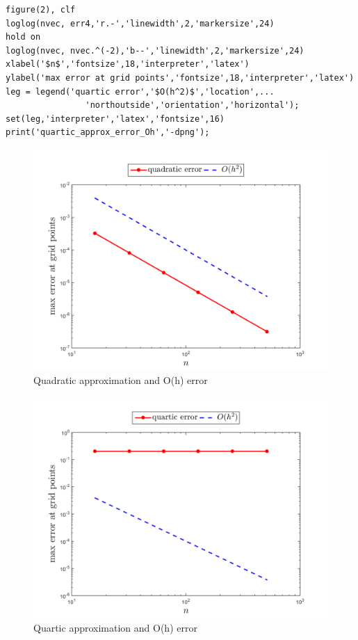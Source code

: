 \documentclass[14pt,a4paper]{article}
\begin{document}
\begin{enumerate}
\begin{lstlisting}
figure(2), clf
loglog(nvec, err4,'r.-','linewidth',2,'markersize',24)
hold on
loglog(nvec, nvec.^(-2),'b--','linewidth',2,'markersize',24)
xlabel('$n$','fontsize',18,'interpreter','latex')
ylabel('max error at grid points','fontsize',18,'interpreter','latex')
leg = legend('quartic error','$O(h^2)$','location',...
				'northoutside','orientation','horizontal');
set(leg,'interpreter','latex','fontsize',16)
print('quartic_approx_error_Oh','-dpng');
	\end{lstlisting}
	\begin{figure}[htp]
		\begin{center}
			\includegraphics[scale=0.65]{quadratic_approx_error_Oh.png}
			\caption{Quadratic approximation and O(h) error}
		\end{center}
	\end{figure}
	\begin{figure}[htp]
		\begin{center}
			\includegraphics[scale=0.65]{quartic_approx_error_Oh.png}
			\caption{Quartic approximation and O(h) error}
		\end{center}
	\end{figure}
	

\end{enumerate}
\end{document}
